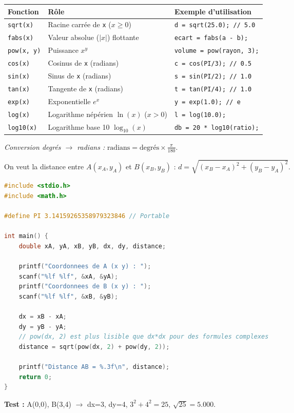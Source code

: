 \documentclass[11pt]{article}
\begin{document}
\begin{center}
\begin{tabularx}{\linewidth}{|l|X|X|}\hline
\textbf{Fonction} & \textbf{Rôle} & \textbf{Exemple d'utilisation} \\\hline
\texttt{sqrt(x)} & Racine carrée de \texttt{x} ($x \ge 0$) & \texttt{d = sqrt(25.0); // 5.0} \\\hline
\texttt{fabs(x)} & Valeur absolue ($|x|$) flottante & \texttt{ecart = fabs(a - b);} \\\hline
\texttt{pow(x, y)} & Puissance $x^y$ & \texttt{volume = pow(rayon, 3);} \\\hline
\texttt{cos(x)} & Cosinus de \texttt{x} (radians) & \texttt{c = cos(PI/3); // 0.5} \\\hline
\texttt{sin(x)} & Sinus de \texttt{x} (radians) & \texttt{s = sin(PI/2); // 1.0} \\\hline
\texttt{tan(x)} & Tangente de \texttt{x} (radians) & \texttt{t = tan(PI/4); // 1.0} \\\hline
\texttt{exp(x)} & Exponentielle $e^x$ & \texttt{y = exp(1.0); // e} \\\hline
\texttt{log(x)} & Logarithme népérien $\ln(x)$ ($x>0$) & \texttt{l = log(10.0);} \\\hline
\texttt{log10(x)} & Logarithme base 10 $\log_{10}(x)$ & \texttt{db = 20 * log10(ratio);} \\\hline
\end{tabularx}
\end{center}

\emph{Conversion degrés $\to$ radians :} $\text{radians} = \text{degrés} \times \frac{\pi}{180}$.

\begin{exemplebox}
On veut la distance entre $A(x_A, y_A)$ et $B(x_B, y_B)$ : $d = \sqrt{(x_B-x_A)^2 + (y_B-y_A)^2}$.
\begin{lstlisting}[language=C]
#include <stdio.h>
#include <math.h>

#define PI 3.14159265358979323846 // Portable

int main() {
    double xA, yA, xB, yB, dx, dy, distance;

    printf("Coordonnees de A (x y) : ");
    scanf("%lf %lf", &xA, &yA);
    printf("Coordonnees de B (x y) : ");
    scanf("%lf %lf", &xB, &yB);

    dx = xB - xA;
    dy = yB - yA;
    // pow(dx, 2) est plus lisible que dx*dx pour des formules complexes
    distance = sqrt(pow(dx, 2) + pow(dy, 2));

    printf("Distance AB = %.3f\n", distance);
    return 0;
}
\end{lstlisting}
\textbf{Test :} A(0,0), B(3,4) $\to$ dx=3, dy=4, $3^2+4^2=25$, $\sqrt{25}=5.000$.
\end{exemplebox}
\end{document}

